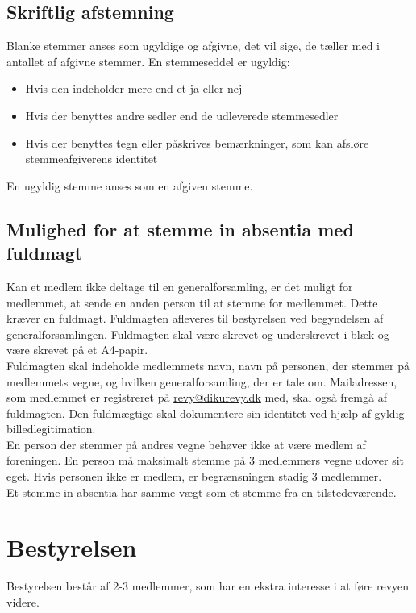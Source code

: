 \documentclass[a4paper,11pt,danish]{article}
\begin{document}
\subsection{Skriftlig afstemning}
Blanke stemmer anses som ugyldige og afgivne, det vil sige, de tæller med i
antallet af afgivne stemmer.  En stemmeseddel er ugyldig: 

\begin{itemize}
\item Hvis den indeholder mere end et ja eller nej
\item Hvis der benyttes andre sedler end de udleverede stemmesedler
\item Hvis der benyttes tegn eller påskrives bemærkninger, som kan afsløre
stemmeafgiverens identitet
\end{itemize}

\noindent En ugyldig stemme anses som en afgiven stemme.

\subsection{Mulighed for at stemme in absentia med fuldmagt}
Kan et medlem ikke deltage til en generalforsamling, er det muligt for 
medlemmet, at sende en anden person til at stemme for medlemmet. Dette kræver en
fuldmagt. Fuldmagten afleveres til bestyrelsen ved begyndelsen af
generalforsamlingen. Fuldmagten skal være skrevet og underskrevet i blæk og være
skrevet på et A4-papir.\\

\noindent Fuldmagten skal indeholde medlemmets navn, navn på personen, der
stemmer på medlemmets vegne, og hvilken generalforsamling, der er tale om.
Mailadressen, som medlemmet er registreret på \url{revy@dikurevy.dk} med, skal
også fremgå af fuldmagten. Den fuldmægtige skal dokumentere sin identitet ved
hjælp af gyldig billedlegitimation.\\

\noindent En person der stemmer på andres vegne behøver ikke at være medlem af
foreningen. En person må maksimalt stemme på 3 medlemmers vegne udover sit eget.
Hvis personen ikke er medlem, er begrænsningen stadig 3 medlemmer.\\

\noindent Et stemme in absentia har samme vægt som et stemme fra en
tilstedeværende.

\section{Bestyrelsen}
Bestyrelsen består af 2-3 medlemmer, som har en ekstra interesse i at føre
revyen videre.\\
\end{document}
